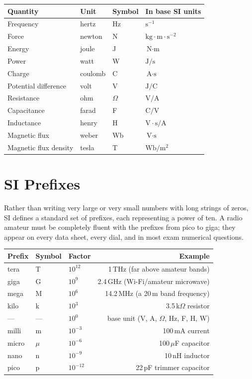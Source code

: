\begin{center}
\begin{tabular}{@{}llll@{}}
\toprule
Quantity & Unit & Symbol & In base SI units \\
\midrule
Frequency & hertz & Hz & $\text{s}^{-1}$ \\
Force & newton & N & $\text{kg}\cdot\text{m}\cdot\text{s}^{-2}$ \\
Energy & joule & J & $\text{N}\cdot\text{m}$ \\
Power & watt & W & $\text{J}/\text{s}$ \\
Charge & coulomb & C & $\text{A}\cdot\text{s}$ \\
Potential difference & volt & V & $\text{J}/\text{C}$ \\
Resistance & ohm & $\Omega$ & $\text{V}/\text{A}$ \\
Capacitance & farad & F & $\text{C}/\text{V}$ \\
Inductance & henry & H & $\text{V}\cdot\text{s}/\text{A}$ \\
Magnetic flux & weber & Wb & $\text{V}\cdot\text{s}$ \\
Magnetic flux density & tesla & T & $\text{Wb}/\text{m}^2$ \\
\bottomrule
\end{tabular}
\end{center}

\section{SI Prefixes}
\label{sec:si-prefixes}

Rather than writing very large or very small numbers with long strings of
zeros, SI defines a standard set of prefixes, each representing a power of
ten. A radio amateur must be completely fluent with the prefixes from
pico to giga; they appear on every data sheet, every dial, and in most
exam numerical questions.

\begin{center}
\begin{tabular}{@{}lllr@{}}
\toprule
Prefix & Symbol & Factor & Example \\
\midrule
tera & T & $10^{12}$ & 1\,THz (far above amateur bands) \\
giga & G & $10^{9}$ & 2.4\,GHz (Wi-Fi/amateur microwave) \\
mega & M & $10^{6}$ & 14.2\,MHz (a 20\,m band frequency) \\
kilo & k & $10^{3}$ & 3.5\,k$\Omega$ resistor \\
--- & --- & $10^{0}$ & base unit (V, A, $\Omega$, Hz, F, H, W) \\
milli & m & $10^{-3}$ & 100\,mA current \\
micro & $\mu$ & $10^{-6}$ & 100\,$\mu$F capacitor \\
nano & n & $10^{-9}$ & 10\,nH inductor \\
pico & p & $10^{-12}$ & 22\,pF trimmer capacitor \\
\bottomrule
\end{tabular}
\end{center}

